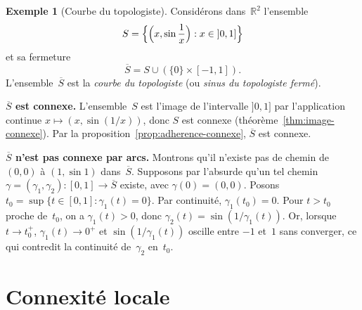 \documentclass[12pt,a4paper,openany]{book}
\theoremstyle{definition}
\theoremstyle{cours}
\theoremstyle{coursnormal}
\newtheorem{exemple}[theoreme]{Exemple}
\begin{document}
\begin{exemple}[Courbe du topologiste]
\label{ex:courbe-topologiste}
Considérons dans~$\mathbb{R}^2$ l'ensemble
\[
S = \Bigl\{ \Bigl(x, \sin\frac{1}{x}\Bigr) : x \in {]0,1]} \Bigr\}
\]
et sa fermeture
\[
\overline{S} = S \cup (\{0\} \times [-1,1]).
\]
L'ensemble~$\overline{S}$ est la \emph{courbe du topologiste} (ou \emph{sinus du
topologiste fermé}).

\begin{center}
\end{center}

\noindent\textbf{$\overline{S}$ est connexe.}
L'ensemble~$S$ est l'image de l'intervalle ${]0,1]}$ par l'application continue
$x \mapsto (x, \sin(1/x))$, donc $S$ est connexe
(théorème~\ref{thm:image-connexe}). Par la
proposition~\ref{prop:adherence-connexe}, $\overline{S}$ est connexe.

\noindent\textbf{$\overline{S}$ n'est pas connexe par arcs.}
Montrons qu'il n'existe pas de chemin de $(0,0)$ à $(1, \sin 1)$ dans~$\overline{S}$.
Supposons par l'absurde qu'un tel chemin
$\gamma = (\gamma_1, \gamma_2) \colon [0,1] \to \overline{S}$ existe, avec
$\gamma(0) = (0,0)$. Posons $t_0 = \sup \{ t \in [0,1] : \gamma_1(t) = 0 \}$.
Par continuité, $\gamma_1(t_0) = 0$.
Pour $t > t_0$ proche de~$t_0$, on a $\gamma_1(t) > 0$, donc
$\gamma_2(t) = \sin(1/\gamma_1(t))$. Or, lorsque $t \to t_0^+$, $\gamma_1(t) \to 0^+$
et $\sin(1/\gamma_1(t))$ oscille entre $-1$ et~$1$ sans converger, ce qui contredit
la continuité de~$\gamma_2$ en~$t_0$.
\end{exemple}

\section{Connexité locale}
\label{sec:connexite-locale}
\end{document}
